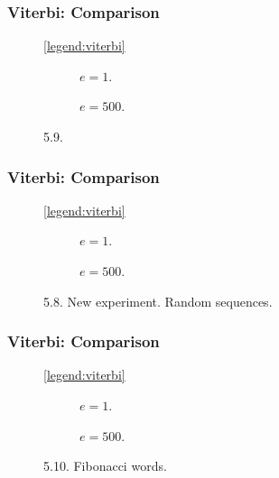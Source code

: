 \documentclass[english,notes]{beamer}
\begin{document}
\begin{frame}
  \frametitle{Viterbi: Comparison}
  \begin{figure}
    \centering\ref{legend:viterbi}\\
    \begin{subfigure}{0.5\textwidth}
      \centering 
      \caption{$e = 1$.}
    \end{subfigure}\hspace{-5mm}%
    \begin{subfigure}{0.5\textwidth}
      \centering 
      \caption{$e=500$.}
    \end{subfigure}
    \caption{5.9.}
  \end{figure}
\end{frame}

\begin{frame}
  \frametitle{Viterbi: Comparison}
  \begin{figure}
    \centering\ref{legend:viterbi}\\
    \begin{subfigure}{0.5\textwidth}
      \centering 
      \caption{$e = 1$.}
    \end{subfigure}\hspace{-5mm}%
    \begin{subfigure}{0.5\textwidth}
      \centering 
      \caption{$e = 500$.}
    \end{subfigure}
    \caption{5.8. New experiment. Random sequences.}
  \end{figure}
\end{frame}

\begin{frame}
  \frametitle{Viterbi: Comparison}
  \begin{figure}
    \centering\ref{legend:viterbi}\\
    \begin{subfigure}[b]{0.5\textwidth}
      \centering 
      \caption{$e = 1$.}
    \end{subfigure}\hspace{-5mm}%
    \begin{subfigure}[b]{0.5\textwidth}
      \centering
      
      \caption{$e = 500$.}
    \end{subfigure}
    \caption{5.10. Fibonacci words.}
  \end{figure}
\end{frame}
\end{document}
